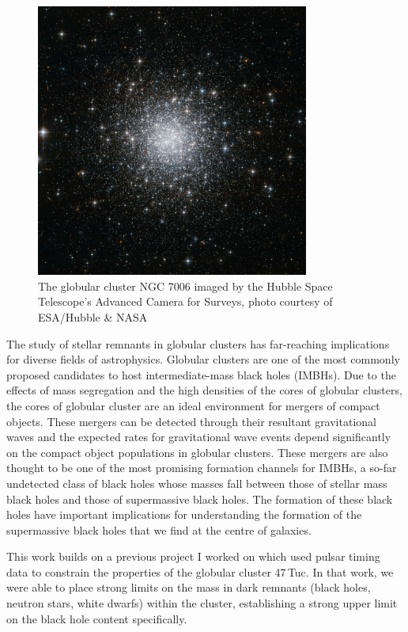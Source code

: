 \begin{figure}
	\centering
	\includegraphics[width=0.8\textwidth]{figures/c42.jpg}
	\caption{The globular cluster NGC 7006 imaged by the Hubble Space Telescope's Advanced
		Camera for Surveys, photo courtesy of ESA/Hubble \& NASA}
	\label{fig:1/ngc7006}
\end{figure}



The study of stellar remnants in globular clusters has far-reaching implications for diverse fields
of astrophysics. Globular clusters are one of the most commonly proposed candidates to host
intermediate-mass black holes (IMBHs). Due to  the effects of mass segregation and the high
densities of the cores of globular clusters, the cores of globular cluster are an ideal environment
for mergers of compact objects. These mergers can be detected through their resultant gravitational
waves and the expected rates for gravitational wave events depend significantly on the compact
object populations in globular clusters. These mergers are also thought to be one of the most
promising formation channels for IMBHs, a so-far undetected class of black holes whose masses fall
between those of stellar mass black holes and those of supermassive black holes. The formation of
these black holes have important implications for understanding the formation of the supermassive
black holes that we find at the centre of galaxies.


This work builds on a previous project I worked on which used pulsar timing data to constrain the
properties of the globular cluster 47\,Tuc. In that work, we were able to place strong limits on the
mass in dark remnants (black holes, neutron stars, white dwarfs) within the cluster, establishing a
strong upper limit on the black hole content specifically.



